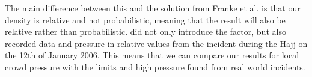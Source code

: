 The main difference between this and the solution from Franke et al. is that our density is relative and not probabilistic, meaning that the result will also be relative rather than probabilistic.  did not only introduce the factor, but also recorded data and pressure in relative values from the incident during the Hajj on the 12th of January 2006\cite{website:Wikipedia-Hajj}. This means that we can compare our results for local crowd pressure with the limits and high pressure found from real world incidents.













